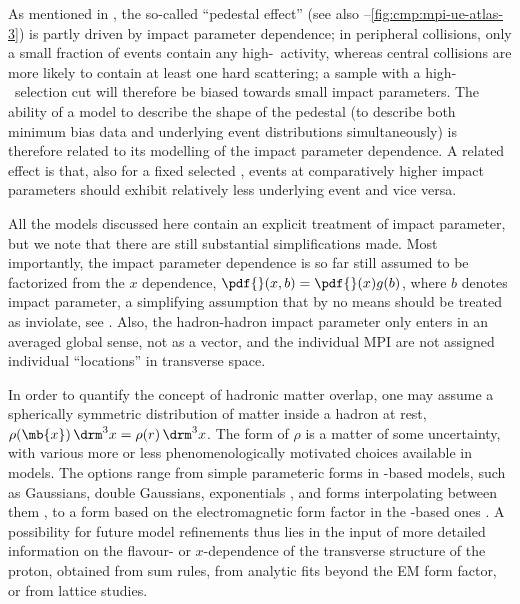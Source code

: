 As mentioned in , the so-called ``pedestal
effect'' (see also
--\ref{fig:cmp:mpi-ue-atlas-3})
is partly driven by impact parameter dependence; in peripheral
collisions, only a small fraction of events contain any
high-\pt\ activity, whereas central collisions are more
likely to contain at least one hard scattering; a sample with a
high-\pt\ selection cut will therefore be biased towards small impact parameters.
The ability of a model to describe the shape of the pedestal (\eg to
describe both minimum bias data and underlying event distributions
simultaneously) is therefore related to its modelling of the
impact parameter dependence.
A related effect is that, also for a fixed selected \pt, events at
comparatively higher impact parameters should exhibit relatively less underlying
event and vice versa.

All the models discussed here contain an explicit treatment of
impact parameter, but we note that there are still
substantial simplifications made. Most importantly, the
impact parameter dependence is so far still assumed to be factorized from
the $x$ dependence, $\pdf{}(x,b)=\pdf{}(x)g(b)$, where $b$ denotes impact
parameter, a simplifying assumption that by no means should be treated
as inviolate, see \eg
\cite{Hagler:2007xi,Treleani:2007gi,Blok:2010ge}. Also, the
hadron-hadron impact parameter only enters in an averaged global
sense, not as a vector, and the individual MPI are not assigned
individual ``locations'' in transverse space.

In order to quantify the concept of hadronic matter overlap, one may
assume a spherically symmetric distribution of matter inside a
hadron at rest, $\rho(\mb{x}) \, \drm^3 x = \rho(r) \, \drm^3 x$.
The form of $\rho$ is a matter of some uncertainty, with various
more or less phenomenologically motivated choices available in
models. The options range from simple parameteric forms in
\pythia-based models, such as Gaussians, double Gaussians,
exponentials \cite{Sjostrand:1987su}, and forms interpolating between
them  \cite{Sjostrand:2004pf}, to a form based on the  electromagnetic
form factor in the \herwig-based ones
\cite{Forshaw:1991gd}. A possibility for future model refinements
thus lies in the input of more detailed information on the flavour-
or $x$-dependence of the transverse structure of the proton, \eg
obtained from sum rules, from analytic fits beyond the EM form factor,
or from lattice studies.

